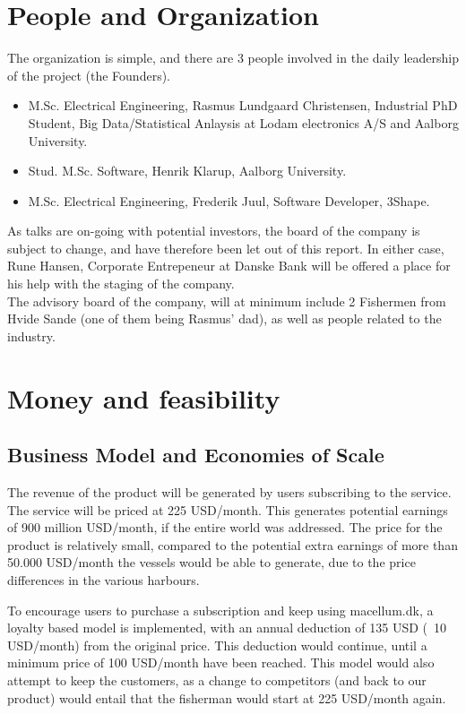 \documentclass[12pt]{article}
\begin{document}
\cleardoublepage
\section{People and Organization}
The organization is simple, and there are 3 people involved in the daily leadership of the project (the Founders).
\begin{itemize}
	\item M.Sc. Electrical Engineering, Rasmus Lundgaard Christensen, Industrial PhD Student, Big Data/Statistical Anlaysis at Lodam electronics A/S and Aalborg University.
	\item Stud. M.Sc. Software, Henrik Klarup, Aalborg University.
	\item M.Sc. Electrical Engineering, Frederik Juul, Software Developer, 3Shape. 
\end{itemize}
As talks are on-going with potential investors, the board of the company is subject to change, and have therefore been let out of this report. In either case, Rune Hansen, Corporate Entrepeneur at Danske Bank will be offered a place for his help with the staging of the company.\\

The advisory board of the company, will at minimum include 2 Fishermen from Hvide Sande (one of them being Rasmus' dad), as well as people related to the industry.
 
\cleardoublepage
\section{Money and feasibility}
\label{money}
\subsection{Business Model and Economies of Scale}
The revenue of the product will be generated by users subscribing to the service. The service will be priced at 225 USD/month. This generates potential earnings of 900 million USD/month, if the entire world was addressed. The price for the product is relatively small, compared to the potential extra earnings of more than 50.000 USD/month the vessels would be able to generate, due to the price differences in the various harbours.

To encourage users to purchase a subscription and keep using macellum.dk, a loyalty based model is implemented, with an annual deduction of 135 USD (~10 USD/month) from the original price. This deduction would continue, until a minimum price of 100 USD/month have been reached. This model would also attempt to keep the customers, as a change to competitors (and back to our product) would entail that the fisherman would start at 225 USD/month again. 
\end{document}
